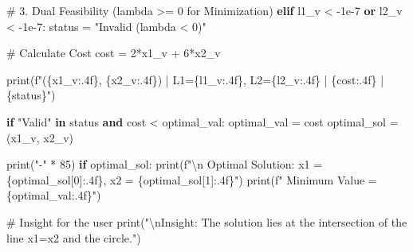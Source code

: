 \documentclass[
  letterpaper,
  DIV=11,
  numbers=noendperiod]{scrreprt}
\newenvironment{Shaded}{\begin{snugshade}}{\end{snugshade}}
\newcommand{\BuiltInTok}[1]{\textcolor[rgb]{0.00,0.23,0.31}{#1}}
\newcommand{\CharTok}[1]{\textcolor[rgb]{0.13,0.47,0.30}{#1}}
\newcommand{\CommentTok}[1]{\textcolor[rgb]{0.37,0.37,0.37}{#1}}
\newcommand{\ControlFlowTok}[1]{\textcolor[rgb]{0.00,0.23,0.31}{\textbf{#1}}}
\newcommand{\DecValTok}[1]{\textcolor[rgb]{0.68,0.00,0.00}{#1}}
\newcommand{\FloatTok}[1]{\textcolor[rgb]{0.68,0.00,0.00}{#1}}
\newcommand{\KeywordTok}[1]{\textcolor[rgb]{0.00,0.23,0.31}{\textbf{#1}}}
\newcommand{\NormalTok}[1]{\textcolor[rgb]{0.00,0.23,0.31}{#1}}
\newcommand{\OperatorTok}[1]{\textcolor[rgb]{0.37,0.37,0.37}{#1}}
\newcommand{\SpecialCharTok}[1]{\textcolor[rgb]{0.37,0.37,0.37}{#1}}
\newcommand{\SpecialStringTok}[1]{\textcolor[rgb]{0.13,0.47,0.30}{#1}}
\newcommand{\StringTok}[1]{\textcolor[rgb]{0.13,0.47,0.30}{#1}}
\begin{document}
\begin{Shaded}
\begin{Highlighting}[]
    \CommentTok{\# 3. Dual Feasibility (lambda \textgreater{}= 0 for Minimization)}
    \ControlFlowTok{elif}\NormalTok{ l1\_v }\OperatorTok{\textless{}} \OperatorTok{{-}}\FloatTok{1e{-}7} \KeywordTok{or}\NormalTok{ l2\_v }\OperatorTok{\textless{}} \OperatorTok{{-}}\FloatTok{1e{-}7}\NormalTok{:}
\NormalTok{        status }\OperatorTok{=} \StringTok{"Invalid (lambda \textless{} 0)"}
        
    \CommentTok{\# Calculate Cost}
\NormalTok{    cost }\OperatorTok{=} \DecValTok{2}\OperatorTok{*}\NormalTok{x1\_v }\OperatorTok{+} \DecValTok{6}\OperatorTok{*}\NormalTok{x2\_v}
    
    \BuiltInTok{print}\NormalTok{(}\SpecialStringTok{f"(}\SpecialCharTok{\{}\NormalTok{x1\_v}\SpecialCharTok{:.4f\}}\SpecialStringTok{, }\SpecialCharTok{\{}\NormalTok{x2\_v}\SpecialCharTok{:.4f\}}\SpecialStringTok{)   | L1=}\SpecialCharTok{\{}\NormalTok{l1\_v}\SpecialCharTok{:.4f\}}\SpecialStringTok{, L2=}\SpecialCharTok{\{}\NormalTok{l2\_v}\SpecialCharTok{:.4f\}}\SpecialStringTok{ | }\SpecialCharTok{\{}\NormalTok{cost}\SpecialCharTok{:.4f\}}\SpecialStringTok{    | }\SpecialCharTok{\{}\NormalTok{status}\SpecialCharTok{\}}\SpecialStringTok{"}\NormalTok{)}
    
    \ControlFlowTok{if} \StringTok{"Valid"} \KeywordTok{in}\NormalTok{ status }\KeywordTok{and}\NormalTok{ cost }\OperatorTok{\textless{}}\NormalTok{ optimal\_val:}
\NormalTok{        optimal\_val }\OperatorTok{=}\NormalTok{ cost}
\NormalTok{        optimal\_sol }\OperatorTok{=}\NormalTok{ (x1\_v, x2\_v)}

\BuiltInTok{print}\NormalTok{(}\StringTok{"{-}"} \OperatorTok{*} \DecValTok{85}\NormalTok{)}
\ControlFlowTok{if}\NormalTok{ optimal\_sol:}
    \BuiltInTok{print}\NormalTok{(}\SpecialStringTok{f"}\CharTok{\textbackslash{}n}\SpecialStringTok{ Optimal Solution: x1 = }\SpecialCharTok{\{}\NormalTok{optimal\_sol[}\DecValTok{0}\NormalTok{]}\SpecialCharTok{:.4f\}}\SpecialStringTok{, x2 = }\SpecialCharTok{\{}\NormalTok{optimal\_sol[}\DecValTok{1}\NormalTok{]}\SpecialCharTok{:.4f\}}\SpecialStringTok{"}\NormalTok{)}
    \BuiltInTok{print}\NormalTok{(}\SpecialStringTok{f"   Minimum Value = }\SpecialCharTok{\{}\NormalTok{optimal\_val}\SpecialCharTok{:.4f\}}\SpecialStringTok{"}\NormalTok{)}
    
    \CommentTok{\# Insight for the user}
    \BuiltInTok{print}\NormalTok{(}\StringTok{"}\CharTok{\textbackslash{}n}\StringTok{Insight: The solution lies at the intersection of the line x1=x2 and the circle."}\NormalTok{)}
\end{Highlighting}
\end{Shaded}
\end{document}
